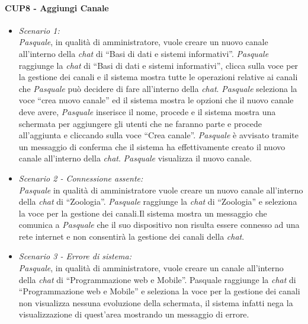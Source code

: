 \paragraph{CUP8 - Aggiungi Canale\\}
\begin{itemize}
	\item \textit{Scenario 1:\\}
	\textit{Pasquale}, in qualità di amministratore, vuole creare un nuovo canale all’interno della \textit{chat} di “Basi di dati e sistemi informativi”. \textit{Pasquale} raggiunge la \textit{chat} di “Basi di dati e sistemi informativi”,  clicca sulla voce per la gestione dei canali e il sistema mostra tutte le operazioni relative ai canali che \textit{Pasquale} può decidere di fare all’interno della \textit{chat}. 
	\textit{Pasquale} seleziona la voce “crea nuovo canale” ed il sistema mostra le opzioni che il nuovo canale deve avere, \textit{Pasquale} inserisce il nome, procede e il sistema mostra una schermata per aggiungere gli utenti che ne faranno parte e procede all’aggiunta e cliccando sulla voce “Crea canale”. \textit{Pasquale} è avvisato tramite un messaggio di conferma che il sistema ha effettivamente creato il nuovo canale all’interno della \textit{chat}. \textit{Pasquale} visualizza il nuovo canale.\\
	
	\item \textit{Scenario 2 - Connessione assente:\\}
	\textit{Pasquale} in qualità di amministratore vuole creare un nuovo canale all’interno della \textit{chat} di “Zoologia”. \textit{Pasquale} raggiunge la \textit{chat} di “Zoologia” e seleziona la voce per la gestione dei canali.Il sistema mostra un messaggio che comunica a \textit{Pasquale} che il suo dispositivo non risulta essere connesso ad una rete internet e non consentirà la gestione dei canali della \textit{chat}.\\
	
	\item \textit{Scenario 3 - Errore di sistema:\\}
	\textit{Pasquale}, in qualità di amministratore, vuole creare un canale all’interno della \textit{chat} di “Programmazione web e Mobile”. Pasquale raggiunge la \textit{chat} di “Programmazione web e Mobile” e seleziona la voce per la gestione dei canali non visualizza nessuna evoluzione della schermata, il sistema infatti nega la visualizzazione di quest’area mostrando un messaggio di errore.\\
	

\end{itemize}
